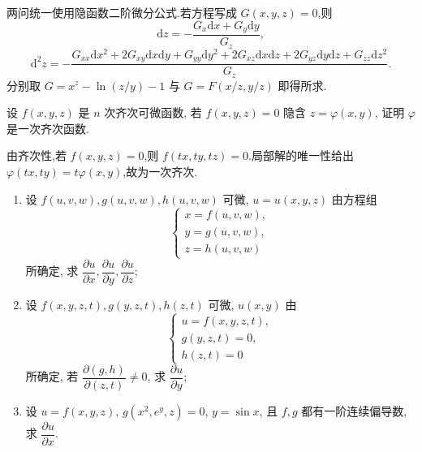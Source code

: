 \begin{solution}
    两问统一使用隐函数二阶微分公式.若方程写成 $G(x,y,z)=0$,则
    \[
        \mathrm dz=-\dfrac{G_x\mathrm dx+G_y\mathrm dy}{G_z},
    \]
    \[
        \mathrm d^2z=-\dfrac{G_{xx}\mathrm dx^2+2G_{xy}\mathrm dx\mathrm dy+G_{yy}\mathrm dy^2
            +2G_{xz}\mathrm dx\mathrm dz+2G_{yz}\mathrm dy\mathrm dz+G_{zz}\mathrm dz^2}{G_z}.
    \]
    分别取 $G=x^z-\ln(z/y)-1$ 与 $G=F(x/z,y/z)$ 即得所求.
\end{solution}

\begin{example}
    设 $f(x,y,z)$ 是 $n$ 次齐次可微函数, 若 $f(x,y,z)=0$ 隐含 $z=\varphi(x,y)$, 证明 $\varphi$ 是一次齐次函数.
\end{example}
\exampleblank

\begin{solution}
    由齐次性,若 $f(x,y,z)=0$,则 $f(tx,ty,tz)=0$.局部解的唯一性给出 $\varphi(tx,ty)=t\varphi(x,y)$,故为一次齐次.
\end{solution}

\begin{example}
    \begin{enumerate}
        \item 设 $f(u,v,w),g(u,v,w),h(u,v,w)$ 可微, $u=u(x,y,z)$ 由方程组
              \[
                  \begin{cases}
                      x=f(u,v,w), \\
                      y=g(u,v,w), \\
                      z=h(u,v,w)
                  \end{cases}
              \]
              所确定, 求 $\dfrac{\partial u}{\partial x},\dfrac{\partial u}{\partial y},\dfrac{\partial u}{\partial z}$;
        \item 设 $f(x,y,z,t),g(y,z,t),h(z,t)$ 可微, $u(x,y)$ 由
              \[
                  \begin{cases}
                      u=f(x,y,z,t), \\
                      g(y,z,t)=0,   \\
                      h(z,t)=0
                  \end{cases}
              \]
              所确定, 若 $\dfrac{\partial(g,h)}{\partial(z,t)}\ne0$, 求 $\dfrac{\partial u}{\partial y}$;
        \item 设 $u=f(x,y,z)$, $g(x^2,e^y,z)=0$, $y=\sin x$, 且 $f,g$ 都有一阶连续偏导数, 求 $\dfrac{\partial u}{\partial x}$.
    \end{enumerate}
\end{example}
\exampleblank

